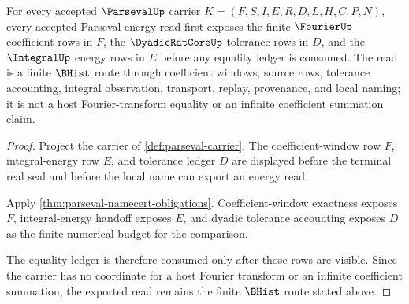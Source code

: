 \begin{theorem}
\label{thm:parseval-fourier-energy-window}
For every accepted $\ParsevalUp$ carrier $K=(F,S,I,E,R,D,L,H,C,P,N)$, every accepted Parseval energy read first exposes the finite $\FourierUp$ coefficient rows in $F$, the $\DyadicRatCoreUp$ tolerance rows in $D$, and the $\IntegralUp$ energy rows in $E$ before any equality ledger is consumed. The read is a finite $\BHist$ route through coefficient windows, source rows, tolerance accounting, integral observation, transport, replay, provenance, and local naming; it is not a host Fourier-transform equality or an infinite coefficient summation claim.
\end{theorem}
\begin{proof}
Project the carrier of \autoref{def:parseval-carrier}. The coefficient-window row $F$, integral-energy row $E$, and tolerance ledger $D$ are displayed before the terminal real seal and before the local name can export an energy read.

Apply \autoref{thm:parseval-namecert-obligations}. Coefficient-window exactness exposes $F$, integral-energy handoff exposes $E$, and dyadic tolerance accounting exposes $D$ as the finite numerical budget for the comparison.

The equality ledger is therefore consumed only after those rows are visible. Since the carrier has no coordinate for a host Fourier transform or an infinite coefficient summation, the exported read remains the finite $\BHist$ route stated above.
\end{proof}

